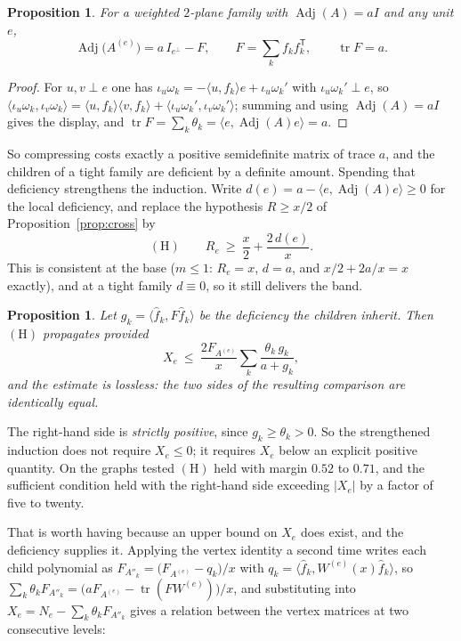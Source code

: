 \documentclass[11pt]{article}
\newtheorem{proposition}[theorem]{Proposition}
\theoremstyle{remark}
\begin{document}
\begin{proposition}\label{prop:deficient}
For a weighted $2$-plane family with $\operatorname{Adj}(A)=aI$ and any unit $e$,
\[
\operatorname{Adj}\bigl(A^{(e)}\bigr)=a\,I_{e^\perp}-F,\qquad F=\sum_kf_kf_k^{\mathsf T},
\qquad \operatorname{tr}F=a .
\]
\end{proposition}

\begin{proof}
For $u,v\perp e$ one has $\iota_u\omega_k=-\langle u,f_k\rangle e+\iota_u\omega_k'$ with
$\iota_u\omega_k'\perp e$, so
$\langle\iota_u\omega_k,\iota_v\omega_k\rangle
=\langle u,f_k\rangle\langle v,f_k\rangle+\langle\iota_u\omega_k',\iota_v\omega_k'\rangle$;
summing and using $\operatorname{Adj}(A)=aI$ gives the display, and
$\operatorname{tr}F=\sum_k\theta_k=\langle e,\operatorname{Adj}(A)e\rangle=a$.
\end{proof}

So compressing costs exactly a positive semidefinite matrix of trace $a$, and the children
of a tight family are deficient by a definite amount. Spending that deficiency strengthens
the induction. Write $d(e)=a-\langle e,\operatorname{Adj}(A)e\rangle\ge0$ for the local
deficiency, and replace the hypothesis $R\ge x/2$ of Proposition~\ref{prop:cross} by
\[
(\mathrm H)\qquad R_e\ \ge\ \frac x2+\frac{2\,d(e)}{x}.
\]
This is consistent at the base ($m\le1$: $R_e=x$, $d=a$, and $x/2+2a/x=x$ exactly), and at
a tight family $d\equiv0$, so it still delivers the band.

\begin{proposition}\label{prop:defstep}
Let $g_k=\langle\hat f_k,F\hat f_k\rangle$ be the deficiency the children inherit. Then
$(\mathrm H)$ propagates provided
\[
X_e\ \le\ \frac{2F_{A^{(e)}}}{x}\sum_k\frac{\theta_k\,g_k}{a+g_k},
\]
and the estimate is lossless: the two sides of the resulting comparison are identically
equal.
\end{proposition}

The right-hand side is \emph{strictly positive}, since $g_k\ge\theta_k>0$. So the
strengthened induction does not require $X_e\le0$; it requires $X_e$ below an explicit
positive quantity. On the graphs tested $(\mathrm H)$ held with margin $0.52$ to $0.71$,
and the sufficient condition held with the right-hand side exceeding $|X_e|$ by a factor
of five to twenty.

That is worth having because an upper bound on $X_e$ does exist, and the deficiency
supplies it. Applying the vertex identity a second time writes each child polynomial as
$F_{A''_k}=\bigl(F_{A^{(e)}}-q_k\bigr)/x$ with
$q_k=\langle\hat f_k,W^{(e)}(x)\hat f_k\rangle$, so
$\sum_k\theta_kF_{A''_k}=\bigl(aF_{A^{(e)}}-\operatorname{tr}(FW^{(e)})\bigr)/x$, and
substituting into $X_e=N_e-\sum_k\theta_kF_{A''_k}$ gives a relation between the vertex
matrices at two consecutive levels:
\end{document}
